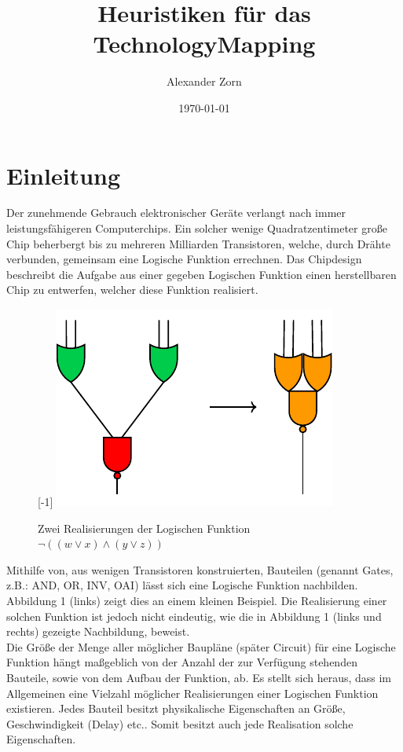 \documentclass[11pt, a4paper, german]{article}
\author{Alexander Zorn}
\date{\today}
\title{Heuristiken f\"ur das TechnologyMapping}
\begin{document}
\maketitle

\tableofcontents
\newpage 
\section{Einleitung}

Der zunehmende Gebrauch elektronischer Geräte verlangt nach immer leistungsfähigeren Computerchips. Ein solcher wenige Quadratzentimeter große Chip beherbergt bis zu mehreren Milliarden Transistoren, welche, durch Drähte verbunden, gemeinsam eine Logische Funktion errechnen. Das Chipdesign beschreibt die Aufgabe aus einer gegeben Logischen Funktion einen herstellbaren Chip zu entwerfen, welcher diese Funktion realisiert. \\ 
\begin{figure}
	\scalebox{1}[-1]{
		\includegraphics[]{pictures/compiled/einfBsp}
	}
		\caption{Zwei Realisierungen der Logischen Funktion $\neg((w\lor x) \land (y \lor z))$}
\end{figure}
Mithilfe von, aus wenigen Transistoren konstruierten, Bauteilen (genannt Gates, z.B.: AND, OR, INV, OAI) lässt sich eine Logische Funktion nachbilden. Abbildung 1 (links) zeigt dies an einem kleinen Beispiel.  Die Realisierung einer solchen Funktion ist jedoch nicht eindeutig, wie die in Abbildung 1 (links und rechts) gezeigte Nachbildung, beweist. \\
Die Größe der Menge aller möglicher Baupläne (später Circuit) für eine Logische Funktion hängt maßgeblich von der Anzahl der zur Verfügung stehenden Bauteile, sowie von dem Aufbau der Funktion, ab.
Es stellt sich heraus, dass im Allgemeinen eine Vielzahl möglicher Realisierungen einer Logischen Funktion existieren. Jedes Bauteil besitzt physikalische Eigenschaften an Größe, Geschwindigkeit (Delay) etc.. Somit besitzt auch jede Realisation solche Eigenschaften. \\
\end{document}
